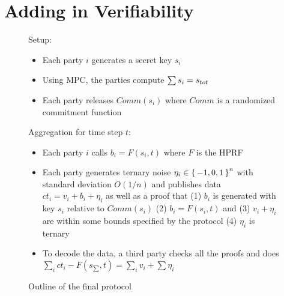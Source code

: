 \section{Adding in Verifiability}
\begin{figure}[H]
	\begin{mdframed}
		Setup: \begin{itemize}
			\item Each party $i$ generates a secret key $s_i$
			\item Using MPC, the parties compute $\sum s_i = s_{tot}$
			\item Each party releases $Comm(s_i)$ where $Comm$ is a randomized commitment function
		\end{itemize}
		Aggregation for time step $t$: \begin{itemize}
			\item Each party $i$ calls $b_i = F(s_i, t)$  where $F$ is the HPRF
			\item Each party generates ternary noise $\eta_i \in \set{-1, 0, 1}^n$ with standard deviation $O(1/n)$ and publishes data $ct_i = v_i + b_i + \eta_i$ as well as a proof that (1) $b_i$ is generated with key $s_i$ relative to $Comm(s_i)$ (2) $b_i = F(s_i, t)$ and (3) $v_i + \eta_i$ are within some bounds specified by the protocol (4) $\eta_i$ is ternary
			\item To decode the data, a third party checks all the proofs and does $\sum_i ct_i - F(s_{\sum}, t) = \sum_i v_i + \sum \eta_i$
		\end{itemize}
	\end{mdframed}
	\caption{Outline of the final protocol}
	\label{fig:prot}
\end{figure}
